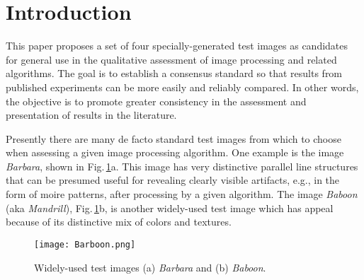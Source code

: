 \documentclass{article}
\begin{document}
\section{Introduction}

This paper proposes a set of four specially-generated test images as 
candidates for general use in the qualitative assessment of image 
processing and related algorithms. The goal is to establish a consensus 
standard so that results from published experiments can be more 
easily and reliably compared. In other words, the objective is to
promote greater consistency in the assessment and presentation
of results in the literature. 

Presently there are many de facto standard test images
from which to choose when assessing a given image processing
algorithm. One example is the image {\em Barbara}, shown in
Fig.\,\ref{barboon}a. This image has very distinctive parallel line structures
that can be presumed useful for revealing clearly visible 
artifacts, e.g., in the form of moire patterns, after processing
by a given algorithm. The image {\em Baboon} (aka {\em Mandrill}), 
Fig.\,\ref{barboon}b, is
another widely-used test image which has appeal because of 
its distinctive mix of colors and textures. 

\begin{figure}
   \centering
   \texttt{[image: Barboon.png]}
\caption{Widely-used test images (a) {\em Barbara}  and  (b)  {\em Baboon}.}
\label{barboon}
\end{figure}



\end{document}
